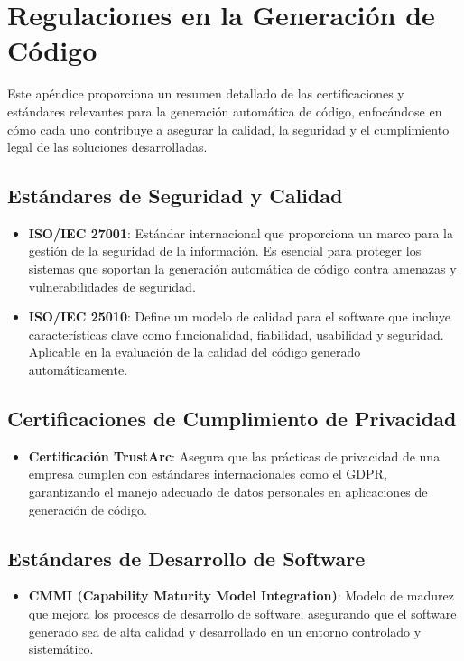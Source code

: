\chapter{Regulaciones en la Generación de Código}
\label{chap:estandares}

\lettrine{E}{}ste apéndice proporciona un resumen detallado de las certificaciones y estándares relevantes para la generación automática de código, enfocándose en cómo cada uno contribuye a asegurar la calidad, la seguridad y el cumplimiento legal de las soluciones desarrolladas.

\section{Estándares de Seguridad y Calidad}
\begin{itemize}
    \item \textbf{ISO/IEC 27001}: Estándar internacional que proporciona un marco para la gestión de la seguridad de la información. Es esencial para proteger los sistemas que soportan la generación automática de código contra amenazas y vulnerabilidades de seguridad. \cite{ISO27001}
    \item \textbf{ISO/IEC 25010}: Define un modelo de calidad para el software que incluye características clave como funcionalidad, fiabilidad, usabilidad y seguridad. Aplicable en la evaluación de la calidad del código generado automáticamente. \cite{ISO25010}
\end{itemize}

\section{Certificaciones de Cumplimiento de Privacidad}
\begin{itemize}
    \item \textbf{Certificación TrustArc}: Asegura que las prácticas de privacidad de una empresa cumplen con estándares internacionales como el \acrshort{GDPR}, garantizando el manejo adecuado de datos personales en aplicaciones de generación de código. \cite{TrustArc2024}
\end{itemize}

\section{Estándares de Desarrollo de Software}
\begin{itemize}
    \item \textbf{CMMI (Capability Maturity Model Integration)}: Modelo de madurez que mejora los procesos de desarrollo de software, asegurando que el software generado sea de alta calidad y desarrollado en un entorno controlado y sistemático. \cite{CMMIInstitute2024}
\end{itemize}


